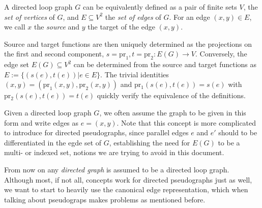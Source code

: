 \begin{remark}
  A directed loop graph $G$ can be equivalently defined as a pair of
  finite sets $V$, the \textit{set of vertices} of
  $G$, and $E \subseteq V^2$ the \textit{set of edges} of $G$. For an
  edge $(x,y) \in E$, we call $x$ the \textit{source} and $y$ the
  target of the edge $(x,y)$.

  Source and target functions are then uniquely determined as the
  projections on the first and second component, $s = \mathrm{pr}_1, t
  = \mathrm{pr}_2: E(G) \to V.$ Conversely, the edge set $E(G)
  \subseteq V^2$ can be determined from the source and target
  functions as $E:=\{(s(e),t(e)) | e \in E\}$. The trivial identities
  $(x,y) = (\mathrm{pr}_1(x,y),\mathrm{pr}_2(x,y))$ and
  $\mathrm{pr_1}(s(e), t(e)) = s(e)$ with $\mathrm{pr_2}(s(e), t(e)) =
  t(e)$ quickly verify the equivalence of the definitions.

  Given a directed loop graph $G$, we often assume the graph to be
  given in this form and write edges as $e=(x,y)$. Note that this
  concept is more complicated to introduce for directed pseudographs,
  since parallel edges $e$ and $e'$ should to be differentiated in the
  egde set of $G$, establishing the need for $E(G)$ to be a multi- or
  indexed set, notions we are trying to avoid in this document.
\end{remark}

From now on any \textit{directed graph} is assumed to be a directed
loop graph. Although most, if not all, concepts work for directed
pseudographs just as well, we want to start to heavily use the
canonical edge representation, which when talking about pseudograps
makes problems as mentioned before.

